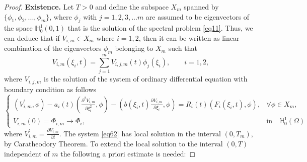 \documentclass[10pt,a4paper]{amsart}
\begin{document}
\begin{proof}
    \textbf{Existence.} Let $T>0$ and define the subspace $X_m$ spanned by $\{\phi_1,\phi_2,...,\phi_m\}$, where $\phi_j$ with $j=1,2,3,...m$ are assumed to be eigenvectors of the space $\mathbb{H}_0^1(0,1)$ that is the solution of the spectral problem \eqref{eq11}. Thus, we can deduce that if $V_{i,m}\in X_m$ where $i=1,2$, then it can be written as linear combination of the eigenvectors $\phi_m$ belonging to $X_m$ such that
    $$V_{i,m}(\xi_i,t)=\sum\limits_{j=1}^m V_{i,j,m}(t)\phi_j(\xi_i),\quad\quad i=1,2,$$
    where $V_{i,j,m}$ is the solution of the system of ordinary differential equation with boundary condition as follows
    \begin{equation}\label{eq62}
        \begin{cases}
            \left(V_{i,m}^{\prime},\phi\right)-a_i(t)\left(\frac{\partial^2 V_{i,m}}{\partial \xi_i^2},\phi\right)-\left(b(\xi_i,t)\frac{\partial V_{i,m}}{\partial \xi_i},\phi\right)=R_i(t)\left(F_i(\xi_i,t),\phi\right),& \forall\phi\in X_m,\\
            V_{i,m}(0)=\Phi_{i,m}\rightarrow \Phi_i,& \text{in}\quad \mathbb{H}_0^1(\Omega) 
        \end{cases}
    \end{equation}
    where $V_{i,m}^{\prime}=\frac{\partial V_{i,m}}{\partial t}$. The system \eqref{eq62}  has local solution in the interval $(0,T_m)$, by Caratheodory Theorem. To extend the local solution to the interval $(0,T)$ independent of $m$ the
    following a priori estimate is needed:


\end{proof}
\end{document}
